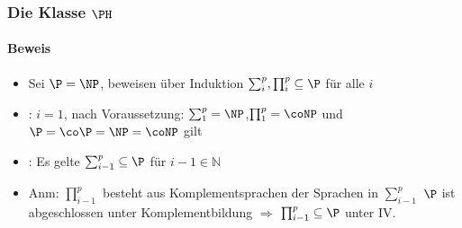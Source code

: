 \begin{frame} 
	\frametitle{Die Klasse $\PH$}
	\framesubtitle{Beweis}
	\begin{itemize}[<+->]
		\item Sei $\P = \NP$, beweisen über Induktion $\sum_{i}^{p},\prod_{i}^{p} \subseteq \P$ für alle $i$
		\bigskip
		\item {}: $i=1$, nach Voraussetzung: $\sum_{1}^{p} = \NP$,\quad$\prod_{1}^{p} = \coNP$ \newline
				und $\P = \co\P = \NP = \coNP$ gilt
		\bigskip
		\item {}: Es gelte  $\sum_{i-1}^{p} \subseteq \P$ für $i-1 \in \mathbb{N}$  
		\item Anm: $\prod_{i-1}^{p}$ besteht aus Komplementsprachen der Sprachen in $\sum_{i-1}^{p}$ \newline $\P$ ist abgeschlossen unter Komplementbildung $\Rightarrow$  $\prod_{i-1}^{p} \subseteq \P$ unter IV.
		
	 
		
	\end{itemize}
\end{frame} 

